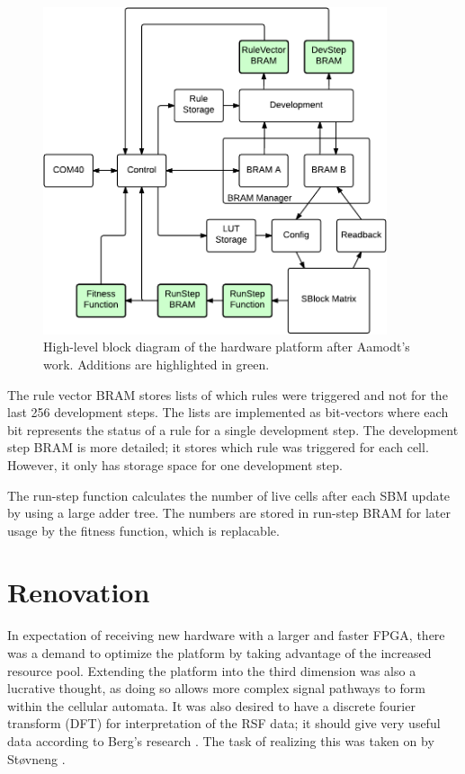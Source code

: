 \begin{figure}[!ht]
    \centering
    \includegraphics[width=0.9\textwidth]{figures/overview-aamodt}
    \caption[High-level block diagram of Aamodt's hardware platform.]{
        High-level block diagram of the hardware platform after Aamodt's work.
        Additions are highlighted in green.
    }
    \label{fig:overview-aamodt}
\end{figure}

The rule vector BRAM stores lists of which rules were triggered and not for the last 256 development steps.
The lists are implemented as bit-vectors where each bit represents the status of a rule for a single development step.
The development step BRAM is more detailed; it stores which rule was triggered for each cell.
However, it only has storage space for one development step.

The run-step function calculates the number of live cells after each SBM update by using a large adder tree.
The numbers are stored in run-step BRAM for later usage by the fitness function, which is replacable.

\section{Renovation}

In expectation of receiving new hardware with a larger and faster FPGA, there was a demand to optimize the platform by taking advantage of the increased resource pool.
Extending the platform into the third dimension was also a lucrative thought, as doing so allows more complex signal pathways to form within the cellular automata.
It was also desired to have a discrete fourier transform (DFT) for interpretation of the RSF data; it should give very useful data according to Berg's research \cite{berg2013ca}.
The task of realizing this was taken on by Støvneng \cite{stovneng2014sblock}.


